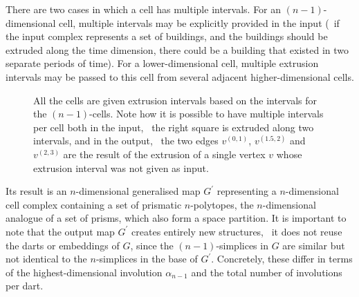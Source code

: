 There are two cases in which a cell has multiple intervals.
For an $(n-1)$-dimensional cell, multiple intervals may be explicitly provided in the input (\eg\ if the input complex represents a set of buildings, and the buildings should be extruded along the time dimension, there could be a building that existed in two separate periods of time).
For a lower-dimensional cell, multiple extrusion intervals may be passed to this cell from several adjacent higher-dimensional cells.
\begin{figure}[tbp]
\centering
{}
{}
\caption[The extrusion intervals of the lower-dimensional cells]{All the cells are given extrusion intervals based on the intervals for the $(n-1)$-cells.
Note how it is possible to have multiple intervals per cell both in the input, \eg\ the right square is extruded along two intervals, and in the output, \eg\ the two edges $v^{(0,1)}$, $v^{(1.5,2)}$ and $v^{(2,3)}$ are the result of the extrusion of a single vertex $v$ whose extrusion interval was not given as input.}
\label{fig:extrusion-intervals}
\end{figure}
Its result is an $n$-dimensional generalised map $G^{\prime}$ representing a $n$-dimensional cell complex containing a set of prismatic $n$-polytopes, the $n$-dimensional analogue of a set of prisms, which also form a space partition.
It is important to note that the output map $G^\prime$ creates entirely new structures, \ie\ it does not reuse the darts or embeddings of $G$, since the $(n-1)$-simplices in $G$ are similar but not identical to the $n$-simplices in the base of $G^\prime$.
Concretely, these differ in terms of the highest-dimensional involution $\alpha_{n-1}$ and the total number of involutions per dart.

